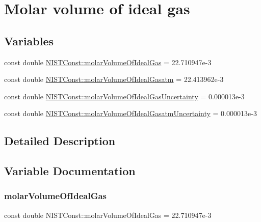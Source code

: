 \hypertarget{group___n_i_s_t_const-_molar_volume}{}\section{Molar volume of ideal gas}
\label{group___n_i_s_t_const-_molar_volume}
\subsection*{Variables}
\begin{DoxyCompactItemize}
\item 
const double \hyperlink{group___n_i_s_t_const-_molar_volume_ga666dc78c2b916ed12bcaf3ec15d7c4d3}{N\+I\+S\+T\+Const\+::molar\+Volume\+Of\+Ideal\+Gas} = 22.\+710947e-\/3
\item 
const double \hyperlink{group___n_i_s_t_const-_molar_volume_ga005e08baa33a25a474bd2287281883c4}{N\+I\+S\+T\+Const\+::molar\+Volume\+Of\+Ideal\+Gasatm} = 22.\+413962e-\/3
\item 
const double \hyperlink{group___n_i_s_t_const-_molar_volume_ga61a743451588f97b027f4ac314ced50a}{N\+I\+S\+T\+Const\+::molar\+Volume\+Of\+Ideal\+Gas\+Uncertainty} = 0.\+000013e-\/3
\item 
const double \hyperlink{group___n_i_s_t_const-_molar_volume_gaff48f0b13c5f974735f0826b7585a0c7}{N\+I\+S\+T\+Const\+::molar\+Volume\+Of\+Ideal\+Gasatm\+Uncertainty} = 0.\+000013e-\/3
\end{DoxyCompactItemize}


\subsection{Detailed Description}


\subsection{Variable Documentation}
\mbox{\label{group___n_i_s_t_const-_molar_volume_ga666dc78c2b916ed12bcaf3ec15d7c4d3}} 
\subsubsection{\texorpdfstring{molar\+Volume\+Of\+Ideal\+Gas}{molarVolumeOfIdealGas}}
{\footnotesize\ttfamily const double N\+I\+S\+T\+Const\+::molar\+Volume\+Of\+Ideal\+Gas = 22.\+710947e-\/3}

